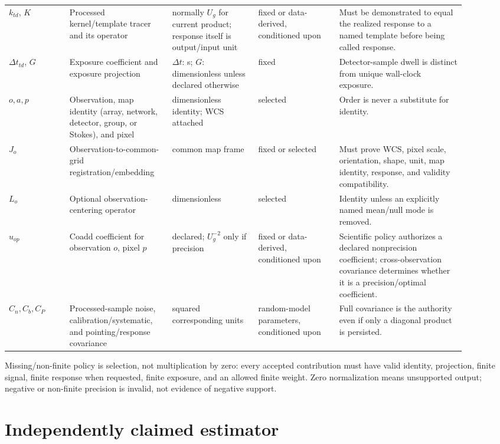 \documentclass[11pt]{article}
\begin{document}
\begin{longtable}{L{0.12\linewidth}L{0.20\linewidth}L{0.17\linewidth}L{0.16\linewidth}L{0.25\linewidth}}
\(k_{td}\), \(K\) & Processed kernel/template tracer and its operator & normally
\(U_g\) for current product; response itself is output/input unit & fixed or
data-derived, conditioned upon & Must be demonstrated to equal the realized
response to a named template before being called response.\\
\(\Delta t_{td}\), \(G\) & Exposure coefficient and exposure projection &
\(\Delta t\): s; \(G\): dimensionless unless declared otherwise & fixed &
Detector-sample dwell is distinct from unique wall-clock exposure.\\
\(o,a,p\) & Observation, map identity
(array, network, detector, group, or Stokes),
and pixel & dimensionless identity; WCS attached & selected & Order is never a
substitute for identity.\\
\(J_o\) & Observation-to-common-grid registration/embedding & common map frame
& fixed or selected & Must prove WCS, pixel scale, orientation, shape, unit,
map identity, response, and validity compatibility.\\
\(L_o\) & Optional observation-centering operator & dimensionless & selected &
Identity unless an explicitly named mean/null mode is removed.\\
\(u_{op}\) & Coadd coefficient for observation \(o\), pixel \(p\) & declared;
\(U_g^{-2}\) only if precision & fixed or data-derived, conditioned upon &
Scientific policy authorizes a declared nonprecision coefficient;
cross-observation covariance determines whether it is a precision/optimal
coefficient.\\
\(C_n,C_b,C_P\) & Processed-sample noise, calibration/systematic, and
pointing/response covariance & squared corresponding units & random-model
parameters, conditioned upon & Full covariance is the authority even if only a
diagonal product is persisted.\\
\bottomrule
\end{longtable}

Missing/non-finite policy is selection, not multiplication by zero: every
accepted contribution must have valid identity, projection, finite signal,
finite response when requested, finite exposure, and an allowed finite weight.
Zero normalization means unsupported output; negative or non-finite precision
is invalid, not evidence of negative support.

\section{Independently claimed estimator}
\end{document}
